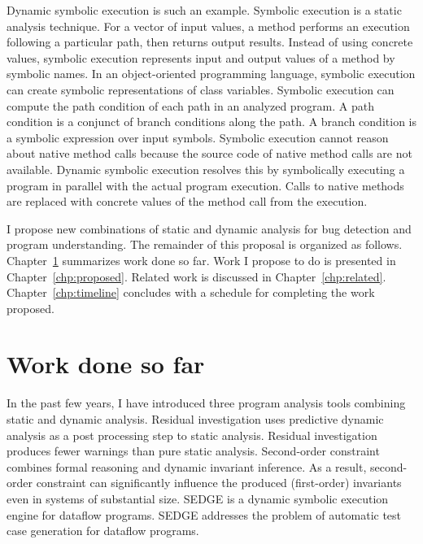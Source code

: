 \documentclass[proposal]{umthesis} %
\begin{document}
Dynamic symbolic execution\cite{Schwartz:2010:YEW:1849417.1849981} is such an example. Symbolic execution is a static analysis technique.  For a vector of input values, a method performs an execution following a particular path, then returns output results.  Instead of using concrete values, symbolic execution represents input and output values of a method by symbolic names. In an object-oriented programming language, symbolic execution can create symbolic representations of class variables. Symbolic execution can compute the path condition of each path in an analyzed program.  A path condition is a conjunct of branch conditions along the path.  A branch condition is a symbolic expression over input symbols. Symbolic execution cannot reason about native method calls because the source code of native method calls are not available.  Dynamic symbolic execution resolves this by symbolically executing a program in parallel with the actual program execution.  Calls to native methods are replaced with concrete values of the method call from the execution.  

I propose new combinations of static and dynamic analysis for bug detection and program understanding.  The remainder of this proposal is organized as follows.  Chapter~\ref{chp:worksofar} summarizes work done so far.  Work I propose to do is presented in Chapter~\ref{chp:proposed}.  Related work is discussed in Chapter~\ref{chp:related}.  Chapter~\ref{chp:timeline} concludes with a schedule for completing the work proposed.   


\chapter{Work done so far}
\label{chp:worksofar}

In the past few years, I have introduced three program analysis tools combining static and dynamic analysis. Residual investigation \cite{rfbi-issta12} uses predictive dynamic analysis as a post processing step to static analysis.  Residual investigation produces fewer warnings than pure static analysis.  Second-order constraint \cite{Li:2013:SCD:2491411.2491457} combines formal reasoning and dynamic invariant inference. As a result, second-order constraint can significantly influence the produced (first-order) invariants even in systems of substantial size.  SEDGE \cite{6693083} is a dynamic symbolic execution engine for dataflow programs.  SEDGE addresses the problem of automatic test case generation for dataflow programs.
\end{document}
